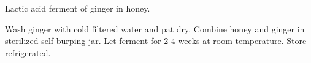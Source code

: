 \documentclass[main]{subfiles}
\begin{document}
Lactic acid ferment of ginger in honey.

\begin{rec}
Wash ginger with cold filtered water and pat dry.
Combine honey and ginger in sterilized self-burping jar.
Let ferment for 2-4 weeks at room temperature.
\newstep
Store refrigerated.
\end{rec}
\end{document}
